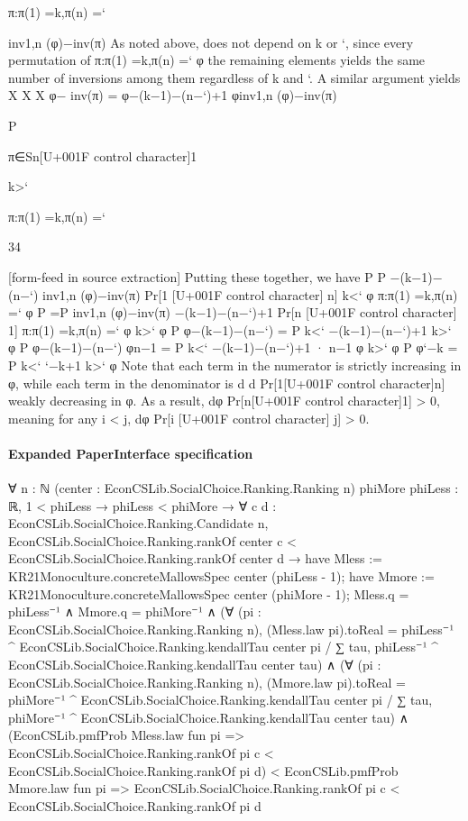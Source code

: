 \documentclass[10pt]{article}
\begin{document}
\begin{ReviewVerbatim}
π:π(1) =k,π(n) =`

inv1,n (φ)−inv(π)
As noted above,
does not depend on k or `, since every permutation of
π:π(1) =k,π(n) =` φ
the remaining elements yields the same number of inversions among them regardless of k and `. A similar
argument yields
X
X
X
φ− inv(π) =
φ−(k−1)−(n−`)+1
φinv1,n (φ)−inv(π)

P

π∈Sn[U+001F control character]1

k>`

π:π(1) =k,π(n) =`

34


[form-feed in source extraction]
Putting these together, we have
P
P
−(k−1)−(n−`)
inv1,n (φ)−inv(π)
Pr[1 [U+001F control character] n]
k<` φ
π:π(1) =k,π(n) =` φ
P
=P
inv1,n (φ)−inv(π)
−(k−1)−(n−`)+1
Pr[n [U+001F control character] 1]
π:π(1) =k,π(n) =` φ
k>` φ
P
φ−(k−1)−(n−`)
= P k<` −(k−1)−(n−`)+1
k>` φ
P
φ−(k−1)−(n−`)
φn−1
= P k<` −(k−1)−(n−`)+1 · n−1
φ
k>` φ
P
φ`−k
= P k<` `−k+1
k>` φ
Note that each term in the numerator is strictly increasing in φ, while each term in the denominator is
d
d Pr[1[U+001F control character]n]
weakly decreasing in φ. As a result, dφ
Pr[n[U+001F control character]1] > 0, meaning for any i < j, dφ Pr[i [U+001F control character] j] > 0.
\end{ReviewVerbatim}


\paragraph{Expanded PaperInterface specification}
\begin{ReviewVerbatim}
∀ {n : ℕ} (center : EconCSLib.SocialChoice.Ranking.Ranking n) {phiMore phiLess : ℝ},
  1 < phiLess →
    phiLess < phiMore →
      ∀ {c d : EconCSLib.SocialChoice.Ranking.Candidate n},
        EconCSLib.SocialChoice.Ranking.rankOf center c < EconCSLib.SocialChoice.Ranking.rankOf center d →
          have Mless := KR21Monoculture.concreteMallowsSpec center (phiLess - 1);
          have Mmore := KR21Monoculture.concreteMallowsSpec center (phiMore - 1);
          Mless.q = phiLess⁻¹ ∧
            Mmore.q = phiMore⁻¹ ∧
              (∀ (pi : EconCSLib.SocialChoice.Ranking.Ranking n),
                  (Mless.law pi).toReal =
                    phiLess⁻¹ ^ EconCSLib.SocialChoice.Ranking.kendallTau center pi /
                      ∑ tau, phiLess⁻¹ ^ EconCSLib.SocialChoice.Ranking.kendallTau center tau) ∧
                (∀ (pi : EconCSLib.SocialChoice.Ranking.Ranking n),
                    (Mmore.law pi).toReal =
                      phiMore⁻¹ ^ EconCSLib.SocialChoice.Ranking.kendallTau center pi /
                        ∑ tau, phiMore⁻¹ ^ EconCSLib.SocialChoice.Ranking.kendallTau center tau) ∧
                  (EconCSLib.pmfProb Mless.law fun pi =>
                      EconCSLib.SocialChoice.Ranking.rankOf pi c < EconCSLib.SocialChoice.Ranking.rankOf pi d) <
                    EconCSLib.pmfProb Mmore.law fun pi =>
                      EconCSLib.SocialChoice.Ranking.rankOf pi c < EconCSLib.SocialChoice.Ranking.rankOf pi d
\end{ReviewVerbatim}
\end{document}

